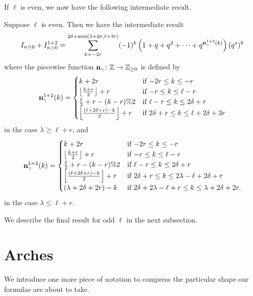 If $\ell$ is even, we now have the following intermediate result.
\begin{proposition}
  \label{prop:ell_even_half}
  Suppose $\ell$ is even.
  Then we have the intermediate result
  \[
    I_{n \le 0} + I_{n > 0}^{\text{1+2}}
    = \sum_{k = -2r}^{2\delta + \min(\lambda+2r, \ell+3r)}
    (-1)^k \left( 1 + q + q^2 + \dots + q^{\mathbf n^{1+2}_{\gamma}(k)}  \right) (q^s)^k
  \]
  where the piecewise function $\mathbf n_\gamma \colon \mathbb Z \to \mathbb Z_{\ge 0}$ is defined by
  \[
    \mathbf n^{1+2}_\gamma(k) =
    \begin{cases}
      k + 2r & \text{if } {-2r} \le k \le -r \\
      \left\lfloor \frac{k+r}{2} \right\rfloor + r & \text{if }{-r} \le k \le \ell-r \\
      \frac{\ell}{2} + r - (k-r)\%2 & \text{if } \ell - r \le k \le 2\delta + r \\
      \left\lfloor \frac{(\ell+2\delta+r)-k}{2} \right\rfloor + r & \text{if } 2\delta + r \le k \le \ell + 2\delta + 3r
    \end{cases}
  \]
  in the case $\lambda \ge \ell+r$, and
  \[
    \mathbf n^{1+2}_\gamma(k) =
    \begin{cases}
      k + 2r & \text{if } {-2r} \le k \le -r \\
      \left\lfloor \frac{k+r}{2} \right\rfloor + r & \text{if }{-r} \le k \le \ell-r \\
      \frac{\ell}{2} + r - (k-r) \% 2 & \text{if } \ell - r \le k \le 2\delta + r \\
      \left\lfloor \frac{(\ell+2\delta+r)-k}{2} \right\rfloor + r & \text{if } 2\delta + r \le k \le 2\lambda - \ell + 2\delta + r \\
      (\lambda + 2\delta + 2r) - k & \text{if } 2 \delta + 2 \lambda - \ell + r \le k \le \lambda + 2\delta + 2r.
    \end{cases}
  \]
  in the case $\lambda \le \ell+r$.
\end{proposition}

We describe the final result for odd $\ell$ in the next subsection.

\section{Arches}
We introduce one more piece of notation to compress
the particular shape our formulas are about to take.

